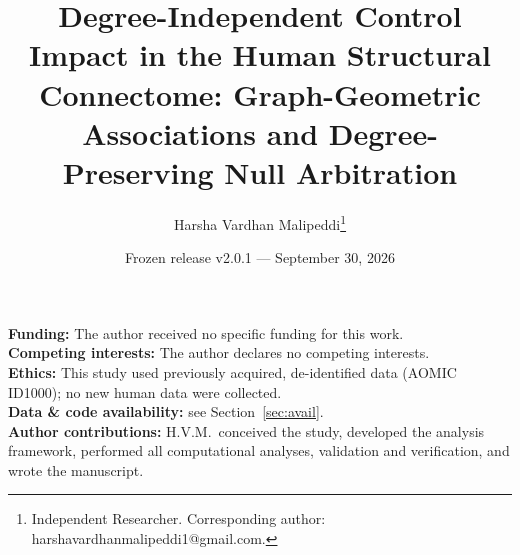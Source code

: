 \documentclass[11pt,a4paper]{article}
\title{\textbf{Degree-Independent Control Impact in the Human Structural
Connectome: Graph-Geometric Associations and Degree-Preserving Null
Arbitration}}
\author{Harsha Vardhan Malipeddi\thanks{Independent Researcher.
Corresponding author: harshavardhanmalipeddi1@gmail.com.}}
\date{Frozen release v2.0.1 --- September 30, 2026}
\begin{document}
\maketitle

\noindent\textbf{Funding:} The author received no specific funding for this work.\\
\textbf{Competing interests:} The author declares no competing interests.\\
\textbf{Ethics:} This study used previously acquired, de-identified data
(AOMIC ID1000); no new human data were collected.\\
\textbf{Data \& code availability:} see Section~\ref{sec:avail}.\\
\textbf{Author contributions:} H.V.M.\ conceived the study, developed the
analysis framework, performed all computational analyses, validation and
verification, and wrote the manuscript.
\end{document}
